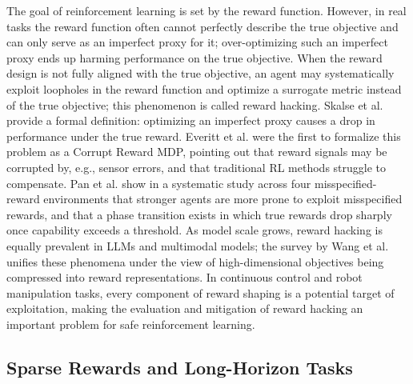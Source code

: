The goal of reinforcement learning is set by the reward function. However, in real tasks the reward function often cannot perfectly describe the true objective and can only serve as an imperfect proxy for it; over-optimizing such an imperfect proxy ends up harming performance on the true objective\cite{karwowski2024goodhart}. When the reward design is not fully aligned with the true objective, an agent may systematically exploit loopholes in the reward function and optimize a surrogate metric instead of the true objective; this phenomenon is called reward hacking\cite{amodei2016concrete}. Skalse et al.\cite{skalse2022defining} provide a formal definition: optimizing an imperfect proxy causes a drop in performance under the true reward. Everitt et al.\cite{everitt2017reinforcement} were the first to formalize this problem as a Corrupt Reward MDP, pointing out that reward signals may be corrupted by, e.g., sensor errors, and that traditional RL methods struggle to compensate. Pan et al.\cite{pan2022effects} show in a systematic study across four misspecified-reward environments that stronger agents are more prone to exploit misspecified rewards, and that a phase transition exists in which true rewards drop sharply once capability exceeds a threshold. As model scale grows, reward hacking is equally prevalent in LLMs and multimodal models; the survey by Wang et al.\cite{wang2026reward} unifies these phenomena under the view of high-dimensional objectives being compressed into reward representations. In continuous control and robot manipulation tasks, every component of reward shaping is a potential target of exploitation, making the evaluation and mitigation of reward hacking an important problem for safe reinforcement learning.

\subsection{Sparse Rewards and Long-Horizon Tasks}

